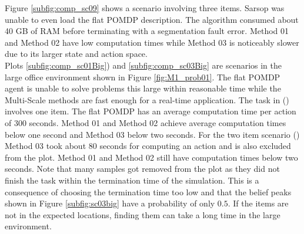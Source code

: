 Figure \ref{subfig:comp_sc09} shows a scenario involving three items. Sarsop was unable to even load the flat POMDP description. The algorithm consumed about 40 GB of RAM before terminating with a segmentation fault error. Method 01 and Method 02 have low computation times while Method 03 is noticeably slower due to its larger state and action space.\\

Plots \ref{subfig:comp_sc01Big}) and \ref{subfig:comp_sc03Big} are scenarios in the large office environment shown in Figure \ref{fig:M1_prob01}. The flat POMDP agent is unable to solve problems this large within reasonable time while the Multi-Scale methods are fast enough for a real-time application. The task in () involves one item. The flat POMDP has an average computation time per action of 300 seconds. Method 01 and Method 02 achieve average computation times below one second and Method 03 below two seconds. For the two item scenario () Method 03 took about 80 seconds for computing an action and is also excluded from the plot. Method 01 and Method 02 still have computation times below two seconds. Note that many samples got removed from the plot as they did not finish the task within the termination time of the simulation. This is a consequence of choosing the termination time too low and that the belief peaks shown in Figure \ref{subfig:sc03big} have a probability of only $0.5$. If the items are not in the expected locations, finding them can take a long time in the large environment. \\


